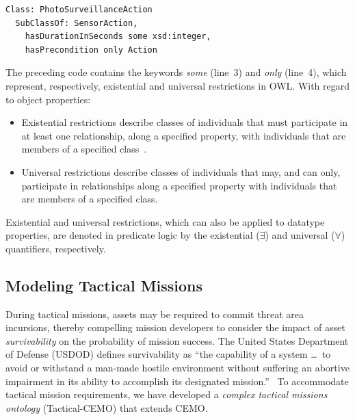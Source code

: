 \begin{lstlisting}[caption={OWL code for class \texttt{PhotoSurveillanceAction}},label=lst:OWL_class_PhotoSurveillanceAction]
Class: PhotoSurveillanceAction
  SubClassOf: SensorAction,
    hasDurationInSeconds some xsd:integer,
    hasPrecondition only Action
\end{lstlisting}

The preceding code contains the keywords \emph{some} (line~3) and \emph{only} (line~4), which represent, respectively, existential and universal restrictions in OWL\@. With regard to object properties:

\begin{itemize}

\item Existential restrictions describe classes of individuals that must participate in at least one relationship, along a specified property, with individuals that are members of a specified class~\cite{Horridge_2011}.

\item Universal restrictions describe classes of individuals that may, and can only, participate in relationships along a specified property with individuals that are members of a specified class.

\end{itemize}

\noindent Existential and universal restrictions, which can also be applied to datatype properties, are denoted in predicate logic by the existential ($\exists$) and universal ($\forall$) quantifiers, respectively.

\subsection{Modeling Tactical Missions}
\label{sec:Modeling_Tactical_Missions}

During tactical missions, assets may be required to commit threat area incursions, thereby compelling mission developers to consider the impact of asset \emph{survivability} on the probability of mission success. The United States Department of Defense (USDOD) defines survivability as ``the capability of a system \ldots\ to avoid or withstand a man-made hostile environment without suffering an abortive impairment in its ability to accomplish its designated mission.''~\cite{DoD_2001} To accommodate tactical mission requirements, we have developed a \emph{complex tactical missions ontology} (Tactical-CEMO) that extends CEMO\@.

